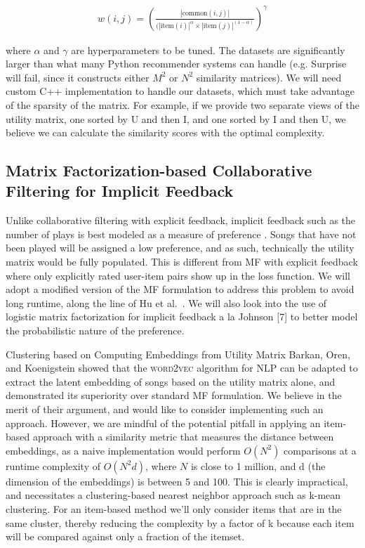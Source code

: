 \documentclass[conference]{IEEEtran}
\begin{document}
\begin{eqnarray*}
w(i, j) = \left(\frac{|\textrm{common}(i, j)|}{(|\textrm{item}(i)|^\alpha \times |\textrm{item}(j)|^{(1-\alpha)}}\right)^\gamma
\end{eqnarray*}

where $\alpha$ and $\gamma$ are hyperparameters to be tuned. The datasets are significantly larger than what many Python recommender systems can handle (e.g. Surprise will fail, since it constructs either $M^2$ or $N^2$ similarity matrices). We will need custom C++ implementation to handle our datasets, which must take advantage of the sparsity of the matrix. For example, if we provide two separate views of the utility matrix, one sorted by U and then I, and one sorted by I and then U, we believe we can calculate the similarity scores with the optimal complexity.

\subsection{Matrix Factorization-based Collaborative Filtering for Implicit Feedback}

Unlike collaborative filtering with explicit feedback, implicit feedback such as the number of plays is best modeled as a measure of preference \cite{hu2008collaborative}. Songs that have not been played will be assigned a low preference, and as such, technically the utility matrix would be fully populated. This is different from MF with explicit feedback where only explicitly rated user-item pairs show up in the loss function. We will adopt a modified version of the MF formulation to address this problem to avoid long runtime, along the line of Hu et al.~\cite{johnson2014logistic}. We will also look into the use of logistic matrix factorization for implicit feedback a la Johnson [7] to better model the probabilistic nature of the preference.

Clustering based on Computing Embeddings from Utility Matrix
Barkan, Oren, and Koenigstein \cite{barkan2016item2vec} showed that the \textsc{word2vec}
 algorithm for NLP can be adapted to extract the latent embedding of songs based on the utility matrix alone, and demonstrated its superiority over standard MF formulation. We believe in the merit of their argument, and would like to consider implementing such an approach. However, we are mindful of the potential pitfall in applying an item-based approach with a similarity metric that measures the distance between embeddings, as a naive implementation would perform
$O(N^2)$ comparisons at a runtime complexity of $O(N^2 d)$, where $N$ is close to 1 million, and d (the dimension of the embeddings) is between 5 and 100. This is clearly impractical, and necessitates a clustering-based nearest neighbor approach such as k-mean clustering. For an item-based method we’ll only consider items that are in the same cluster, thereby reducing the complexity by a factor of k because each item will be compared against only a fraction of the itemset.
\end{document}
